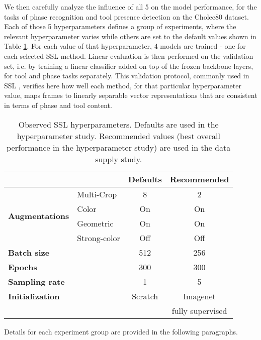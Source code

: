 \documentclass[times,twocolumn,final]{elsarticle}
\begin{document}
We then carefully analyze the influence of all 5 on the model performance, for the tasks of phase recognition and tool presence detection on the Cholec80 dataset. Each of those 5 hyperparameters defines a group of experiments, where the relevant hyperparameter varies while others are set to the default values shown in Table \ref{tab:hp_defaults}. For each value of that hyperparameter, 4 models are trained - one for each selected SSL method. Linear evaluation is then performed on the validation set, i.e. by training a linear classifier added on top of the frozen backbone layers, for tool and phase tasks separately. This validation protocol, commonly used in SSL \citep{feichtenhofer2021large}, verifies here how well each method, for that particular hyperparameter value, maps frames to linearly separable vector representations that are consistent in terms of phase and tool content.
\begin{table}[]
\centering
\small
\caption{Observed SSL hyperparameters. Defaults are used in the hyperparameter study. Recommended values (best overall performance in the hyperparameter study) are used in the data supply study.}
\label{tab:hp_defaults}
\begin{tabular}{llcc}\hline
\multicolumn{2}{l}{}                                   & \textbf{Defaults} & \textbf{Recommended} \\ \hline
\multirow{4}{*}{\textbf{Augmentations}} & Multi-Crop   & 8        & 2                         \\
                                        & Color        & On       & On                        \\
                                        & Geometric    & On       & On                        \\
                                        & Strong-color & Off      & Off                       \\
\multicolumn{2}{l}{\textbf{Batch size}}                & 512      & 256                       \\
\multicolumn{2}{l}{\textbf{Epochs}}               & 300      & 300                       \\
\multicolumn{2}{l}{\textbf{Sampling rate}}       & 1        & 5                         \\
\multicolumn{2}{l}{\textbf{Initialization}}            & Scratch  & Imagenet                  \\
& & & fully supervised\\\hline
\end{tabular}
\end{table}
Details for each experiment group are provided in the following paragraphs.
\end{document}
